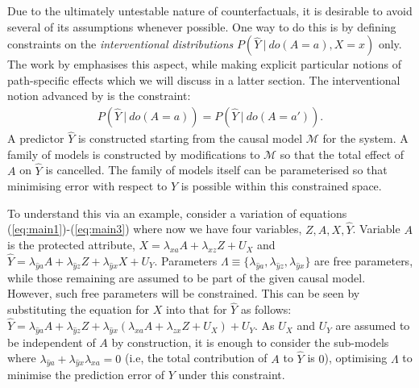\documentclass{article}
\begin{document}
Due to the ultimately untestable nature of counterfactuals, it is
desirable to avoid several of its assumptions whenever possible. One
way to do this is by defining constraints on the \emph{interventional
  distributions} $P(\hat Y\ |\ do(A = a), X = x)$ only. The work by
\cite{kilbertus:17} emphasises this aspect, while making explicit
particular notions of path-specific effects which we will discuss in a
latter section. The interventional notion advanced by
\cite{kilbertus:17} is the constraint:
\begin{align*}
P(\hat Y\ |\ do(A = a)) = P(\hat Y\ |\ do(A = a')).
\end{align*}
A predictor
$\hat Y$ is constructed starting from the causal model $\mathcal M$
for the system. A family of models is constructed by
modifications to $\mathcal M$ so that the total effect of $A$ on $\hat Y$ is
cancelled. The family of models itself can be parameterised so that
minimising error with respect to $Y$ is possible within this
constrained space.

To understand this via an example, consider a variation of equations
(\ref{eq:main1})-(\ref{eq:main3}) where now we have four variables,
$Z, A, X, \hat Y$. Variable $A$ is the protected attribute, $X = \lambda_{xa}A
+ \lambda_{xz}Z + U_X$ and $\hat Y = \lambda_{\hat ya}A +
\lambda_{\hat yz}Z + \lambda_{\hat yx}X + U_Y$. Parameters $\Lambda
\equiv \{\lambda_{\hat ya}, \lambda_{\hat yz}, \lambda_{\hat yx}\}$
are free parameters, while those remaining are assumed to be part of the
given causal model. However, such free parameters will be
constrained. This can be seen by substituting the equation for $X$ into that for $\hat Y$ as follows: $\hat Y = \lambda_{\hat ya}A + \lambda_{\hat yz}Z +
\lambda_{\hat yx}(\lambda_{xa}A + \lambda_{zx}Z + U_X) + U_Y$. As
$U_X$ and $U_Y$ are assumed to be independent of $A$ by construction,
it is enough to consider the sub-models where $\lambda_{\hat ya} +
\lambda_{\hat yx}\lambda_{xa} = 0$ (i.e, the total contribution of $A$ to $\hat Y$ is $0$), optimising $\Lambda$ to
minimise the prediction error of $Y$ under this constraint.
\end{document}
